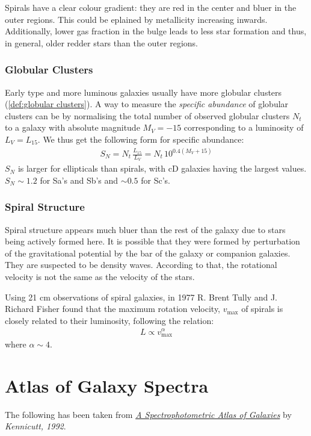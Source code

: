 \documentclass[a4paper,11pt]{report}
\newcommand{\ti}[1]{\textit{#1}}
\newcommand{\tx}[1]{\text{#1}}
\begin{document}
Spirals have a clear colour gradient: they are red in the center and bluer in the outer regions. This could be eplained by metallicity increasing inwards. Additionally, lower gas fraction in the bulge leads to less star formation and thus, in general, older redder stars than the outer regions.

\subsubsection{Globular Clusters}
Early type and more luminous galaxies usually have more globular clusters (\ref{def:globular clusters}). A way to measure the \ti{specific abundance} of globular clusters can be by normalising the total number of observed globular clusters $N_t$ to a galaxy with absolute magnitude $M_V = -15$ corresponding to a luminosity of $L_V  = L_{15}$. We thus get the following form for specific abundance:
\begin{align*}
  S_N = N_t \, \frac{L_{15}}{L_V} = N_t \, 10^{0.4(M_V + 15)}
\end{align*}
$S_N$ is larger for ellipticals than spirals, with cD galaxies having the largest values. $S_N \sim 1.2$ for Sa's and Sb's and $\sim 0.5$ for Sc's.

\subsubsection{Spiral Structure}
Spiral structure appears much bluer than the rest of the galaxy due to stars being actively formed here. It is possible that they were formed by perturbation of the gravitational potential by the bar of the galaxy or companion galaxies. They are suspected to be density waves. According to that, the rotational velocity is not the same as the velocity of the stars.

\vspace{1em}

Using 21 cm observations of spiral galaxies, in 1977 R. Brent Tully and J. Richard Fisher found that the maximum rotation velocity, $v_\text{max}$ of spirals is closely related to their luminosity, following the relation:
\begin{align*}
  L \propto v_\tx{max}^\alpha
\end{align*}
where $\alpha \sim 4$.

\section{Atlas of Galaxy Spectra}
The following has been taken from \href{https://ui.adsabs.harvard.edu/abs/1992ApJS...79..255K/abstract}{\ti{A Spectrophotometric Atlas of Galaxies}} by \ti{Kennicutt, 1992}.
\end{document}
